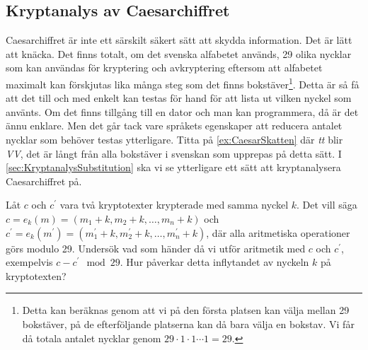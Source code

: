 \subsection{Kryptanalys av Caesarchiffret}
\label{sec:KryptanalysCaesar}
Caesarchiffret är inte ett särskilt säkert sätt att skydda information.
Det är lätt att knäcka.
Det finns totalt, om det svenska alfabetet används, 29 olika nycklar som kan 
användas för kryptering och avkryptering eftersom att alfabetet maximalt kan 
förskjutas lika många steg som det finns bokstäver\footnote{%
	Detta kan beräknas genom att vi på den första platsen kan välja mellan 29 
	bokstäver, på de efterföljande platserna kan då bara välja en bokstav.  Vi 
	får då totala antalet nycklar genom \(29\cdot 1\cdot 1\cdots 1 = 29\).
}.
Detta är så få att det till och med enkelt kan testas för hand för att lista ut 
vilken nyckel som använts.
Om det finns tillgång till en dator och man kan programmera, då är det ännu 
enklare.
Men det går tack vare språkets egenskaper att reducera antalet nycklar som 
behöver testas ytterligare.
Titta på \cref{ex:CaesarSkatten} där \emph{tt} blir \emph{VV}, det är 
långt från alla bokstäver i svenskan som upprepas på detta sätt.
I \cref{sec:KryptanalysSubstitution} ska vi se ytterligare ett sätt att 
kryptanalysera Caesarchiffret på.

\begin{exercise}\label{xrc:caesarAddition}
  Låt \(c\) och \(c^\prime\) vara två kryptotexter krypterade med samma nyckel 
  \(k\).
  Det vill säga \(c = e_k(m) = (m_1+k, m_2+k, \ldots, m_n+k)\) och \(c^\prime 
  = e_k(m^\prime) = (m^\prime_1+k, m^\prime_2+k, \ldots, m^\prime_n+k)\), där 
  alla aritmetiska operationer görs modulo 29.
  Undersök vad som händer då vi utför aritmetik med \(c\) och \(c^\prime\), 
  exempelvis \(c - c^\prime \mod 29\).
  Hur påverkar detta inflytandet av nyckeln \(k\) på kryptotexten?
\end{exercise}

